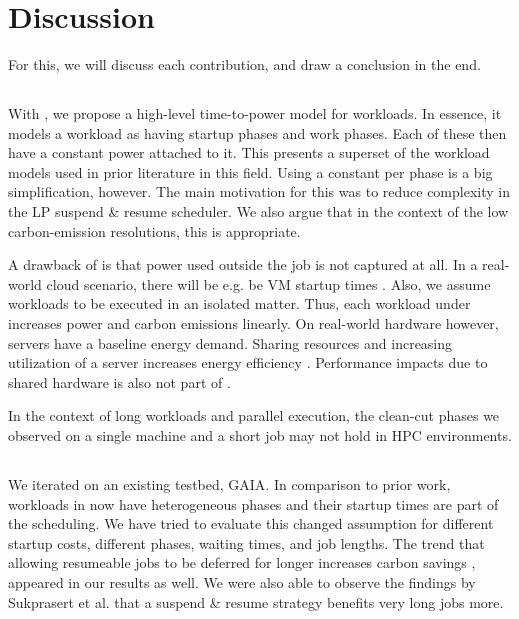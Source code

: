 \chapter{Discussion} \label{sec:discussion}

For this, we will discuss each contribution, and draw a conclusion in the end.

\section{\modelname{}}

With \modelname{}, we propose a high-level time-to-power model for workloads.
In essence, it models a workload as having startup phases and work phases. 
Each of these then have a constant power attached to it. 
This presents a superset of the workload models used in prior literature in this field.
Using a constant per phase is a big simplification, however. 
The main motivation for this was to reduce complexity in the LP suspend \& resume scheduler.
We also argue that in the context of the low carbon-emission resolutions, this is appropriate.

A drawback of \modelname{} is that power used outside the job is not captured at all.
In a real-world cloud scenario, there will be e.g. be VM startup times \cite{zheng_benchmarking_2019}.
Also, we assume workloads to be executed in an isolated matter. 
Thus, each workload under \modelname{} increases power and carbon emissions linearly.
On real-world hardware however, servers have a baseline energy demand. 
Sharing resources and increasing utilization of a server increases energy efficiency \cite{barroso_case_2007}. 
Performance impacts due to shared hardware is also not part of \modelname{}.

In the context of long workloads and parallel execution, the clean-cut phases we observed on a single machine and a short job may 
not hold in HPC environments.

\section{\programname{}}

We iterated on an existing testbed, GAIA.
In comparison to prior work, workloads in \programname{} now have heterogeneous phases and their startup times are part of the scheduling.
We have tried to evaluate this changed assumption for different startup costs, different phases, waiting times, and job lengths. 
The trend that allowing resumeable jobs to be deferred for longer increases carbon savings \cite{wiesner_lets_2021,hanafy_going_2024, hanafy_war_2023}, appeared in our results as well. 
We were also able to observe the findings by Sukprasert et al. \cite{sukprasert_limitations_2024} that a suspend \& resume strategy benefits very long jobs more.

